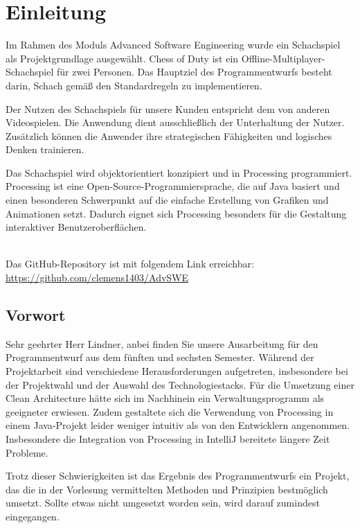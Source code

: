 \chapter{Einleitung}

Im Rahmen des Moduls \glqq Advanced Software Engineering\grqq{} wurde ein Schachspiel als Projektgrundlage ausgewählt. 
Chess of Duty ist ein Offline-Multiplayer-Schachspiel für zwei Personen. 
Das Hauptziel des Programmentwurfs besteht darin, Schach gemäß den Standardregeln zu implementieren. 

Der Nutzen des Schachspiels für unsere Kunden entspricht dem von anderen Videospielen. 
Die Anwendung dient ausschließlich der Unterhaltung der Nutzer. 
Zusätzlich können die Anwender ihre strategischen Fähigkeiten und logisches Denken trainieren.

Das Schachspiel wird objektorientiert konzipiert und in Processing programmiert. 
Processing ist eine Open-Source-Programmiersprache, die auf Java basiert und einen besonderen Schwerpunkt auf die einfache Erstellung von Grafiken und Animationen setzt. 
Dadurch eignet sich Processing besonders für die Gestaltung interaktiver Benutzeroberflächen. 

\begin{balken}
    \tip
    \\
    Das GitHub-Repository ist mit folgendem Link erreichbar:\\
    \url{https://github.com/clemens1403/AdvSWE}
\end{balken}

\section{Vorwort}

Sehr geehrter Herr Lindner, anbei finden Sie unsere Ausarbeitung für den Programmentwurf aus dem fünften und sechsten Semester. 
Während der Projektarbeit sind verschiedene Herausforderungen aufgetreten, insbesondere bei der Projektwahl und der Auswahl des Technologiestacks. 
Für die Umsetzung einer Clean Architecture hätte sich im Nachhinein ein Verwaltungsprogramm als geeigneter erwiesen. 
Zudem gestaltete sich die Verwendung von Processing in einem Java-Projekt leider weniger intuitiv als von den Entwicklern angenommen. 
Insbesondere die Integration von Processing in IntelliJ bereitete längere Zeit Probleme.

Trotz dieser Schwierigkeiten ist das Ergebnis des Programmentwurfs ein Projekt, das die in der Vorlesung vermittelten Methoden und Prinzipien bestmöglich umsetzt. 
Sollte etwas nicht umgesetzt worden sein, wird darauf zumindest eingegangen. 

